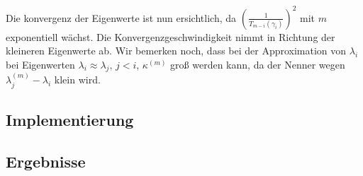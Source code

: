 \documentclass{article}
\begin{document}
Die konvergenz der Eigenwerte ist nun ersichtlich, da $\left(\frac{1}{T_{m-i}(\gamma_i)}\right)^2$ mit $m$ exponentiell wächst. Die Konvergenzgeschwindigkeit nimmt in Richtung der kleineren Eigenwerte ab. Wir bemerken noch, dass bei der Approximation von $\lambda_i$ bei Eigenwerten $\lambda_i \approx \lambda_j, \, j < i$, $\kappa^{(m)}$ groß werden kann, da der Nenner wegen $\lambda^{(m)}_j - \lambda_i$ klein wird.


\subsection{Implementierung}

\subsection{Ergebnisse}

\newpage

\end{document}
